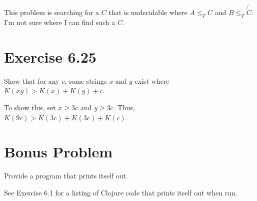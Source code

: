 \documentclass{article}
\begin{document}
This problem is searching for a $C$ that is undecidable where $A \leq_T C$ and
$B \leq_T \not{C}$. I'm not sure where I can find such a $C$.

\section{Exercise 6.25}

Show that for any $c$, some strings $x$ and $y$ exist where $K(xy) > K(x) +
K(y) + c$. 

To show this, set $x \geq 3c$ and $y \geq 3c$. Thus, $K(9c) > K(3c) + K(3c) +
K(c)$. 

\section{Bonus Problem}

Provide a program that prints itself out.

See Exercise 6.1 for a listing of Clojure code that prints itself out when run.
\end{document}
